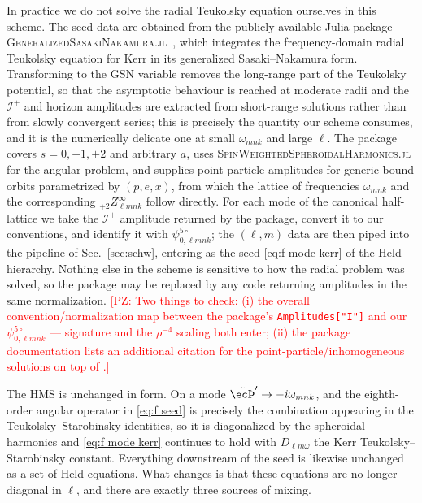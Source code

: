 \documentclass[%
reprint,
 prd,
superscriptaddress,
nofootinbib,
aps,
dvipsnames
]{revtex4-2}
\newcommand{\PZ}[1]{\textcolor{red}{\textsf{[PZ: #1]}}}
\newcommand{\emm}{m}
\def\thpH{\tilde{\th}'}
\def\th{\hbox{\ec\char'336}}
\def\th{\hbox{\ec\char'336}}
\def\l{\ensuremath{\ell}}                          %
\def\Dlw{D_{\ell\emm\omega}}                %
\newcommand{\Zinf}[2]{{}_{#1}Z^{\infty}_{#2}}
\newcommand{\psifiveM}[1]{\psi^{5\circ}_{0,#1}}       %
\def\lmnk{\l \emm n k}
\def\wmnk{\omega_{\emm n k}}
\def\scri{\mathscr{I}^{+}}
\begin{document}
In practice we do not solve the radial Teukolsky equation ourselves in this
scheme. The seed data are obtained from the publicly available Julia package
\textsc{GeneralizedSasakiNakamura.jl}~\cite{Lo:2023fvv,GSNjl}, which integrates
the frequency-domain radial Teukolsky equation for Kerr in its generalized
Sasaki--Nakamura form. Transforming to the GSN variable removes the long-range
part of the Teukolsky potential, so that the asymptotic behaviour is reached at
moderate radii and the $\scri$ and horizon amplitudes are extracted from
short-range solutions rather than from slowly convergent series; this is
precisely the quantity our scheme consumes, and it is the numerically delicate
one at small $\wmnk$ and large $\ell$. The package covers $s=0,\pm1,\pm2$ and
arbitrary $a$, uses \textsc{SpinWeightedSpheroidalHarmonics.jl} for the angular
problem, and supplies point-particle amplitudes for generic bound orbits
parametrized by $(p,e,x)$, from which the lattice of frequencies $\wmnk$ and the
corresponding $\Zinf{+2}{\lmnk}$ follow directly. For each mode of the canonical
half-lattice we take the $\scri$ amplitude returned by the package, convert it
to our conventions, and identify it with $\psifiveM{\lmnk}$; the $(\ell,\emm)$
data are then piped into the pipeline of Sec.~\ref{sec:schw}, entering as the
seed \eqref{eq:f mode kerr} of the Held hierarchy. Nothing else in the scheme is
sensitive to how the radial problem was solved, so the package may be replaced
by any code returning amplitudes in the same normalization.
\PZ{Two things to check: (i) the overall convention/normalization map between
the package's \texttt{Amplitudes["I"]} and our $\psifiveM{\lmnk}$ --- signature
and the $\rho^{-4}$ scaling both enter; (ii) the package documentation lists an
additional citation for the point-particle/inhomogeneous solutions on top of
\cite{Lo:2023fvv}.}

The HMS is unchanged in form. On a mode $\thpH\to-i\wmnk$, and the eighth-order
angular operator in \eqref{eq:f seed} is precisely the combination appearing in
the Teukolsky--Starobinsky identities, so it is diagonalized by the spheroidal
harmonics and \eqref{eq:f mode kerr} continues to hold with $\Dlw$ the Kerr
Teukolsky--Starobinsky constant. Everything downstream of the seed is likewise
unchanged as a set of Held equations. What changes is that these equations are
no longer diagonal in $\ell$, and there are exactly three sources of mixing.
\end{document}
